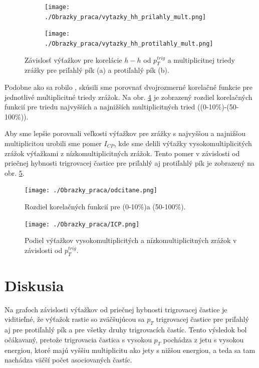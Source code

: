 \documentclass[thesismargins, thesislinespacing]{rnthesis}
\begin{document}
\begin{figure}
	\centering
	\begin{subfigure}{0.5\textwidth}
		\centering
		\texttt{[image: ./Obrazky\_praca/vytazky\_hh\_prilahly\_mult.png]}
		\caption{}
		\label{hhpril}
	\end{subfigure}%
	\begin{subfigure}{0.5\textwidth}
		\centering
		\texttt{[image: ./Obrazky\_praca/vytazky\_hh\_protilahly\_mult.png]}
		\caption{}
		\label{hhproti}
	\end{subfigure}
	\caption{Závislosť výťažkov pre korelácie $h - h$ od $p_T^{trig}$ a multiplicitnej triedy zrážky pre priľahlý pík (a) a protiľahlý pík (b).}
	\label{hhmult}
\end{figure}

Podobne ako sa robilo \cite{AlicepPb}, skúsili sme porovnať dvojrozmerné korelačné funkcie pre jednotlivé multiplicitné triedy zrážok. Na obr. \ref{multroz} je zobrazený rozdiel korelačných funkcií pre triedu najvyšších a najnižších multiplicitných tried ((0-10\%)-(50-100\%)).

Aby sme lepšie porovnali veľkosti výťažkov pre zrážky s najvyššou a najnižšou multiplicitou urobili sme pomer $I_{CP}$, kde sme delili výťažky vysokomultiplicitých zrážok výťažkami  z nízkomultiplicitných zrážok. Tento pomer v závislosti od priečnej hybnosti trigrovacej častice pre priľahlý aj protiľahlý pík je zobrazený na obr. \ref{Icpnase}. 

\begin{figure}[hbtp!]
	\centering
	\texttt{[image: ./Obrazky\_praca/odcitane.png]}
	\caption{Rozdiel korelačných funkcií pre (0-10\%)a (50-100\%).}
	\label{multroz}
\end{figure}

\begin{figure}[hbtp!]
	\centering
	\texttt{[image: ./Obrazky\_praca/ICP.png]}
	\caption{Podiel výťažkov vysokomultiplicitých a nízkomultiplicitných zrážok v závislosti od $p_{T}^{trig}$.}
	\label{Icpnase}
\end{figure}

\chapter{Diskusia}
 
Na grafoch závislosti výťažkov od priečnej hybnosti trigrovacej častice je viditieľné, že výťažok rastie so zväčšujúcou sa $p_T$ trigrovacej častice pre priľahlý aj pre protiľahlý pík a pre všetky druhy trigrovacích častíc. Tento výsledok bol očákavaný, pretože trigrovacia častica s vysokou $p_T$ pochádza z jetu s vysokou energiou, ktoré majú vyššiu multiplicitu ako jety s nižšou energiou, a teda sa tam nachádza väčší počet asociovaných častíc. 
\end{document}
